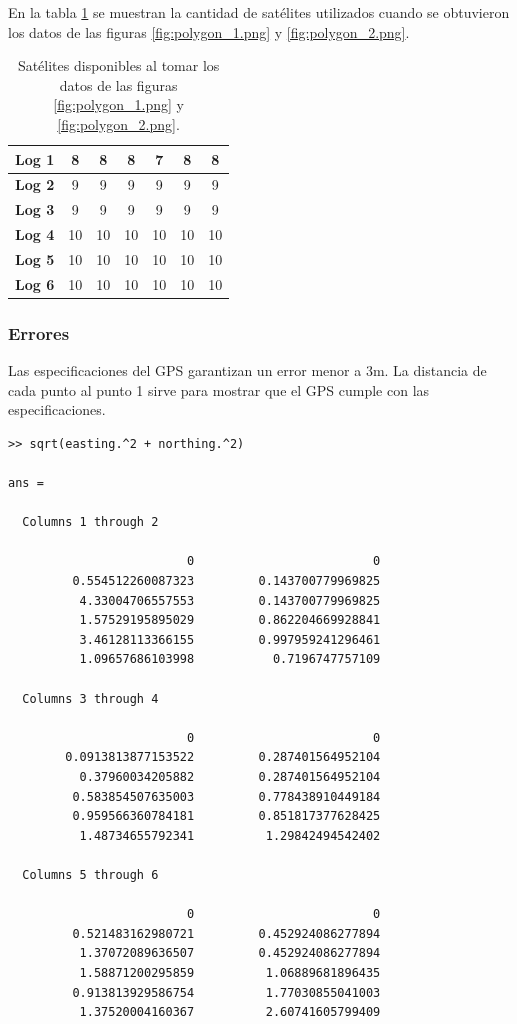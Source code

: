 \documentclass[spanish,12pt,a4paper,titlepage]{report}
\begin{document}
En la tabla \ref{tab:polygon-sat} se muestran la cantidad de satélites utilizados cuando se obtuvieron los datos de las figuras \ref{fig:polygon_1.png} y \ref{fig:polygon_2.png}.

\begin{table}[H]
\begin{center}
\begin{tabular}{|l||c|c|c|c|c|c|}
\hline
\textbf{Log 1} & 8 & 8 & 8 & 7 & 8 & 8 \\
\hline
\textbf{Log 2} & 9 & 9 & 9 & 9 & 9 & 9 \\
\hline
\textbf{Log 3} & 9 & 9 & 9 & 9 & 9 & 9 \\
\hline
\textbf{Log 4} & 10 & 10 & 10 & 10 & 10 & 10 \\
\hline
\textbf{Log 5} & 10 & 10 & 10 & 10 & 10 & 10 \\
\hline
\textbf{Log 6} & 10 & 10 & 10 & 10 & 10 & 10\\
\hline
\end{tabular} 
\caption{Satélites disponibles al tomar los datos de las figuras \ref{fig:polygon_1.png} y \ref{fig:polygon_2.png}.}
\label{tab:polygon-sat}
\end{center}
\end{table}

\newpage
\subsubsection*{Errores}
\label{sec:errores}

Las especificaciones del GPS garantizan un error menor a 3m. La distancia de cada punto al punto 1 sirve para mostrar que el GPS cumple con las especificaciones. 

\begin{verbatim}
>> sqrt(easting.^2 + northing.^2)

ans =

  Columns 1 through 2

                         0                         0
         0.554512260087323         0.143700779969825
          4.33004706557553         0.143700779969825
          1.57529195895029         0.862204669928841
          3.46128113366155         0.997959241296461
          1.09657686103998           0.7196747757109

  Columns 3 through 4

                         0                         0
        0.0913813877153522         0.287401564952104
          0.37960034205882         0.287401564952104
         0.583854507635003         0.778438910449184
         0.959566360784181         0.851817377628425
          1.48734655792341          1.29842494542402

  Columns 5 through 6

                         0                         0
         0.521483162980721         0.452924086277894
          1.37072089636507         0.452924086277894
          1.58871200295859          1.06889681896435
         0.913813929586754          1.77030855041003
          1.37520004160367          2.60741605799409
\end{verbatim}
\end{document}
